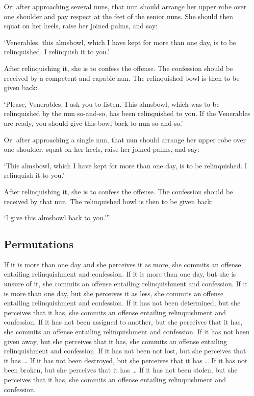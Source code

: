 \documentclass[12pt,openany]{book}%
\begin{document}
Or: after approaching several nuns, that nun should arrange her upper robe over one shoulder and pay respect at the feet of the senior nuns. She should then squat on her heels, raise her joined palms, and say: 

‘Venerables, this almsbowl, which I have kept for more than one day, is to be relinquished. I relinquish it to you.’ 

After relinquishing it, she is to confess the offense. The confession should be received by a competent and capable nun. The relinquished bowl is then to be given back: 

‘Please, Venerables, I ask you to listen. This almsbowl, which was to be relinquished by the nun so-and-so, has been relinquished to you. If the Venerables are ready, you should give this bowl back to nun so-and-so.’ 

Or: after approaching a single nun, that nun should arrange her upper robe over one shoulder, squat on her heels, raise her joined palms, and say: 

‘This almsbowl, which I have kept for more than one day, is to be relinquished. I relinquish it to you.’ 

After relinquishing it, she is to confess the offense. The confession should be received by that nun. The relinquished bowl is then to be given back: 

‘I give this almsbowl back to you.’” 

\subsection*{Permutations }

If it is more than one day and she perceives it as more, she commits an offense entailing relinquishment and confession. If it is more than one day, but she is unsure of it, she commits an offense entailing relinquishment and confession. If it is more than one day, but she perceives it as less, she commits an offense entailing relinquishment and confession. If it has not been determined, but she perceives that it has, she commits an offense entailing relinquishment and confession. If it has not been assigned to another, but she perceives that it has, she commits an offense entailing relinquishment and confession. If it has not been given away, but she perceives that it has, she commits an offense entailing relinquishment and confession. If it has not been not lost, but she perceives that it has … If it has not been destroyed, but she perceives that it has … If it has not been broken, but she perceives that it has … If it has not been stolen, but she perceives that it has, she commits an offense entailing relinquishment and confession. 
\end{document}
